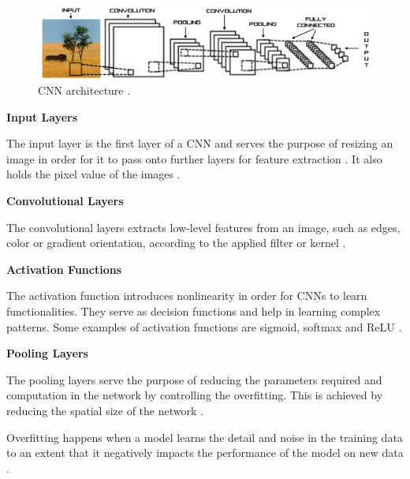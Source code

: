             \vspace{+2.5cm}
            \begin{figure}[H]
                \centering
                \captionsetup{justification=centering}
                \includegraphics[width=\textwidth]{Sections/2StateOfTheArt/2_images/conv.png}
                \caption[CNN architecture]{CNN architecture \cite{Ribeiro}.}  
                \label{fig:cnnn}
            \end{figure}

            \newpage
           \par \textbf{Input Layers}
           \par The input layer is the first layer of a CNN and serves the purpose of resizing an image in order for it  to pass onto further layers for feature extraction \cite{Ribeiro}. It also holds the pixel value of the images \cite{OShea2015}. \bigbreak
            
          
           \par \textbf{Convolutional Layers}
           \par The convolutional layers extracts low-level features from an image, such as edges, color or gradient orientation, according to the applied filter or kernel \cite{Ribeiro}. \bigbreak

           \par \textbf{Activation Functions}
           \par The activation function introduces nonlinearity in order for CNNs to learn functionalities. They serve as decision functions and help in learning complex patterns. Some examples of activation functions are sigmoid, softmax and ReLU \cite{Ribeiro}. \bigbreak

           \par \textbf{Pooling Layers} 
           \par The pooling layers serve the purpose of reducing the parameters required and computation in the network by controlling the overfitting. This is achieved by reducing the spatial size of the network \cite{Ribeiro}.
           \par Overfitting happens when a model learns the detail and noise in the training data to an extent that it negatively impacts the performance of the model on new data \cite{OShea2015}. \bigbreak


